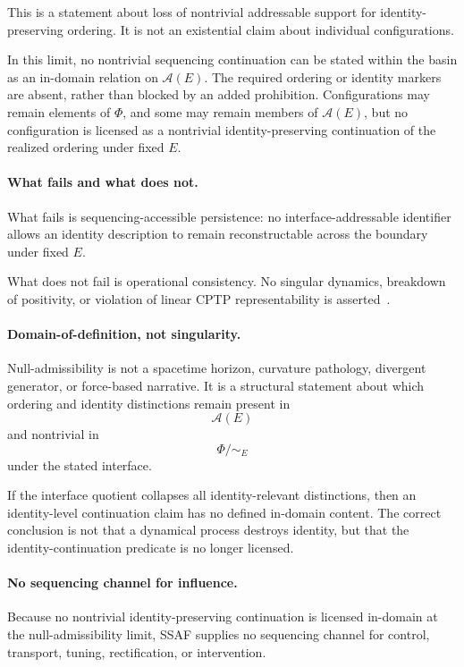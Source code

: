 \documentclass[aps,prx,onecolumn,11pt]{revtex4-2}
\theoremstyle{plain}
\theoremstyle{definition}
\theoremstyle{remark}
\begin{document}
This is a statement about loss of nontrivial addressable support for
identity-preserving ordering. It is not an existential claim about
individual configurations.

In this limit, no nontrivial sequencing continuation can be stated
within the basin as an in-domain relation on \(\mathcal A(E)\). The
required ordering or identity markers are absent, rather than blocked
by an added prohibition. Configurations may remain elements of
\(\Phi\), and some may remain members of \(\mathcal A(E)\), but no
configuration is licensed as a nontrivial identity-preserving
continuation of the realized ordering under fixed \(E\).

\paragraph{What fails and what does not.}

What fails is sequencing-accessible persistence: no
interface-addressable identifier allows an identity description to
remain reconstructable across the boundary under fixed \(E\).

What does not fail is operational consistency. No singular dynamics,
breakdown of positivity, or violation of linear CPTP representability
is asserted~\cite{Lindblad1976,Gorini1976}.

\paragraph{Domain-of-definition, not singularity.}

Null-admissibility is not a spacetime horizon, curvature pathology,
divergent generator, or force-based narrative. It is a structural
statement about which ordering and identity distinctions remain present
in
\[
\mathcal A(E)
\]
and nontrivial in
\[
\Phi/{\sim_E}
\]
under the stated interface.

If the interface quotient collapses all identity-relevant distinctions,
then an identity-level continuation claim has no defined in-domain
content. The correct conclusion is not that a dynamical process destroys
identity, but that the identity-continuation predicate is no longer
licensed.

\paragraph{No sequencing channel for influence.}

Because no nontrivial identity-preserving continuation is licensed
in-domain at the null-admissibility limit, SSAF supplies no sequencing
channel for control, transport, tuning, rectification, or intervention.
\end{document}
